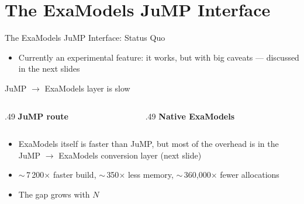 \documentclass[aspectratio=169,11pt]{beamer}
\begin{document}
\section{The ExaModels JuMP Interface}
\begin{frame}[fragile]{The ExaModels JuMP Interface: Status Quo}
  \scriptsize
  \begin{codebox}\end{codebox}
  \medskip
  \normalsize
  \begin{itemize}
  \item Currently an \alert{experimental feature}: it works, but with \alert{big caveats} --- discussed in the next slides
  \end{itemize}
\end{frame}

\begin{frame}[fragile]{JuMP $\to$ ExaModels layer is slow}
  \scriptsize
  \begin{columns}[T]
    \begin{column}{.49\textwidth}
      \alert{\bfseries JuMP route}
      \begin{codebox}\end{codebox}
      \begin{replbox}\end{replbox}
    \end{column}
    \begin{column}{.49\textwidth}
      \alert{\bfseries Native ExaModels}
      \begin{codebox}\end{codebox}
      \begin{replbox}\end{replbox}
    \end{column}
  \end{columns}
  \medskip
  \normalsize
  \begin{itemize}\itemsep1pt
  \item ExaModels itself is faster than JuMP, but \alert{most of the overhead is in the JuMP $\to$ ExaModels conversion layer} (next slide)
  \item<2-> $\sim$\,\alert{7\,200$\times$ faster} build, $\sim$\,\alert{350$\times$ less memory}, $\sim$\,\alert{360{,}000$\times$ fewer allocations}
  \item<3-> The gap \alert{grows with $N$}
  \end{itemize}
\end{frame}
\end{document}
